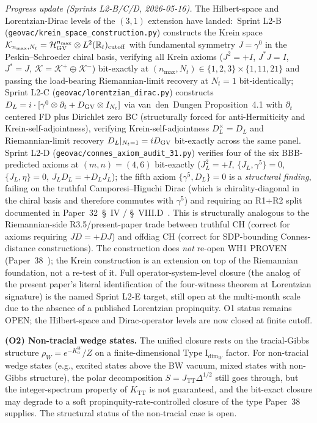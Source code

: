 \documentclass[11pt,a4paper]{article}
\theoremstyle{plain}
\theoremstyle{definition}
\newcommand{\nmax}{n_{\max}}
\newcommand{\TT}{\mathrm{TT}}
\begin{document}
\emph{Progress update (Sprints L2-B/C/D, 2026-05-16).}
The Hilbert-space and Lorentzian-Dirac levels of the $(3, 1)$
extension have landed:\ Sprint L2-B
(\texttt{geovac/krein\_space\_construction.py}) constructs the
Krein space $\mathcal{K}_{\nmax, N_t} = \mathcal{H}_{\rm GV}^{\nmax}
\otimes L^2(\mathbb{R}_t)_{\rm cutoff}$ with fundamental symmetry
$J = \gamma^0$ in the Peskin--Schroeder chiral basis, verifying all
Krein axioms ($J^2 = +I$, $J^* J = I$, $J^* = J$,
$\mathcal{K} = \mathcal{K}^+ \oplus \mathcal{K}^-$) bit-exactly at
$(\nmax, N_t) \in \{1, 2, 3\} \times \{1, 11, 21\}$ and passing the
load-bearing Riemannian-limit recovery at $N_t = 1$ bit-identically;
Sprint L2-C (\texttt{geovac/lorentzian\_dirac.py}) constructs
$D_L = i \cdot [\gamma^0 \otimes \partial_t + D_{\rm GV} \otimes I_{N_t}]$
via van~den~Dungen Proposition~4.1 with $\partial_t$ centered FD plus
Dirichlet zero BC (structurally forced for anti-Hermiticity and
Krein-self-adjointness), verifying Krein-self-adjointness
$D_L^\times = D_L$ and Riemannian-limit recovery $D_L|_{N_t = 1} =
i D_{\rm GV}$ bit-exactly across the same panel.  Sprint L2-D
(\texttt{geovac/connes\_axiom\_audit\_31.py}) verifies four of the
six BBB-predicted axioms at $(m, n) = (4, 6)$ bit-exactly
($J_L^2 = +I$, $\{J_L, \gamma^5\} = 0$, $\{J_L, \eta\} = 0$,
$J_L D_L = +D_L J_L$); the fifth axiom $\{\gamma^5, D_L\} = 0$ is a
\emph{structural finding}, failing on the truthful Camporesi--Higuchi
Dirac (which is chirality-diagonal in the chiral basis and therefore
commutes with $\gamma^5$) and requiring an R1+R2 split documented in
Paper~32~\S~IV / \S~VIII.D~\cite{paper32}.  This is structurally
analogous to the Riemannian-side R3.5/present-paper trade between
truthful CH (correct for axioms requiring $JD = +DJ$) and offdiag CH
(correct for SDP-bounding Connes-distance constructions).  The
construction does \emph{not} re-open WH1 PROVEN
(Paper~38~\cite{paper38}); the Krein construction is an extension on
top of the Riemannian foundation, not a re-test of it.  Full
operator-system-level closure (the analog of the present paper's
literal identification of the four-witness theorem at Lorentzian
signature) is the named Sprint L2-E target, still open at the
multi-month scale due to the absence of a published Lorentzian
propinquity.  O1 status remains OPEN; the Hilbert-space and
Dirac-operator levels are now closed at finite cutoff.

\textbf{(O2) Non-tracial wedge states.}
The unified closure rests on the tracial-Gibbs structure
$\rho_W = e^{-K_\alpha^W}/Z$ on a finite-dimensional Type I$_{\dim_W}$
factor. For non-tracial wedge states (e.g., excited states above the
BW vacuum, mixed states with non-Gibbs structure), the polar
decomposition $S = J_{\TT} \Delta^{1/2}$ still goes through, but the
integer-spectrum property of $K_{\TT}$ is not guaranteed, and the
bit-exact closure may degrade to a soft propinquity-rate-controlled
closure of the type Paper~38 supplies. The structural status of the
non-tracial case is open.
\end{document}
